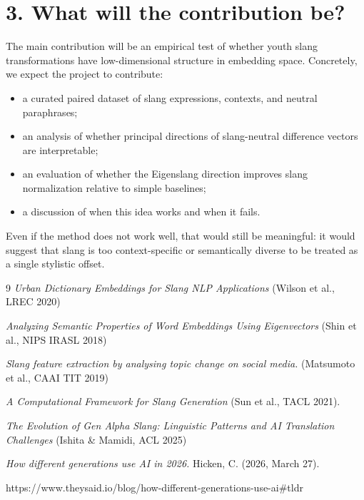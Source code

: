 \documentclass[11pt]{article}
\begin{document}
\section*{3. What will the contribution be?}
The main contribution will be an empirical test of whether youth slang transformations have low-dimensional structure in embedding space. Concretely, we expect the project to contribute:
\begin{itemize}
    \item a curated paired dataset of slang expressions, contexts, and neutral paraphrases;
    \item an analysis of whether principal directions of slang-neutral difference vectors are interpretable;
    \item an evaluation of whether the Eigenslang direction improves slang normalization relative to simple baselines;
    \item a discussion of when this idea works and when it fails.
\end{itemize}

Even if the method does not work well, that would still be meaningful: it would suggest that slang is too context-specific or semantically diverse to be treated as a single stylistic offset.

\small
\begin{thebibliography}{9}
\textit{Urban Dictionary Embeddings for Slang NLP Applications} (Wilson et al., LREC 2020)

\textit{Analyzing Semantic Properties of Word Embeddings Using Eigenvectors} (Shin et al., NIPS IRASL 2018)

 \textit{Slang feature extraction by analysing topic change on social media.} (Matsumoto et al., CAAI TIT 2019)

\textit{A Computational Framework for Slang Generation} (Sun et al., TACL 2021).

\textit{The Evolution of Gen Alpha Slang: Linguistic Patterns and AI Translation Challenges} (Ishita \& Mamidi, ACL 2025)

 \textit{How different generations use AI in 2026.} Hicken, C. (2026, March 27).
 
 https://www.theysaid.io/blog/how-different-generations-use-ai\#tldr 
\end{thebibliography}
\end{document}
